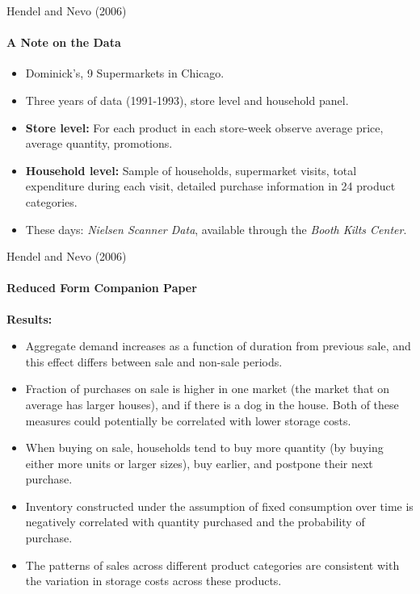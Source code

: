 \documentclass[11pt,aspectratio=169]{beamer}
\begin{document}
\begin{frame}{Hendel and Nevo (2006)}
\framesubtitle{A Note on the Data}
\begin{itemize}
\footnotesize
\item[$-$] Dominick's, 9 Supermarkets in Chicago.
\item[$-$] Three years of data (1991-1993), store level and household panel. 
\item[$-$] \textbf{Store level:} For each product in each store-week observe average price, average quantity, promotions.
\item[$-$] \textbf{Household level:} Sample of households, supermarket visits, total expenditure during each visit, detailed purchase information in 24 product categories.
\item These days: \textit{Nielsen Scanner Data}, available through the \textit{Booth Kilts Center}. 
\end{itemize}
\end{frame}


\begin{frame}{Hendel and Nevo (2006)}
\framesubtitle{Reduced Form Companion Paper}
\small
\textbf{Results:}
\begin{itemize}\footnotesize
\item[$-$] Aggregate demand increases as a function of duration from previous sale, and this
effect differs between sale and non-sale periods. 
\item[$-$] Fraction of purchases on sale is higher in one market (the market that on average has larger houses), and if there is a dog in the house. Both
of these measures could potentially be correlated with lower storage costs. 
\item[$-$] When buying on sale, households tend to buy more quantity (by buying either more units or larger sizes), buy
earlier, and postpone their next purchase.
\item[$-$]  Inventory constructed under the assumption of fixed consumption over time is negatively correlated with quantity purchased and the probability of purchase. 
\item[$-$] The patterns of sales across different product categories are consistent with the variation in storage costs across these products. 
\end{itemize}
\end{frame}
\end{document}
